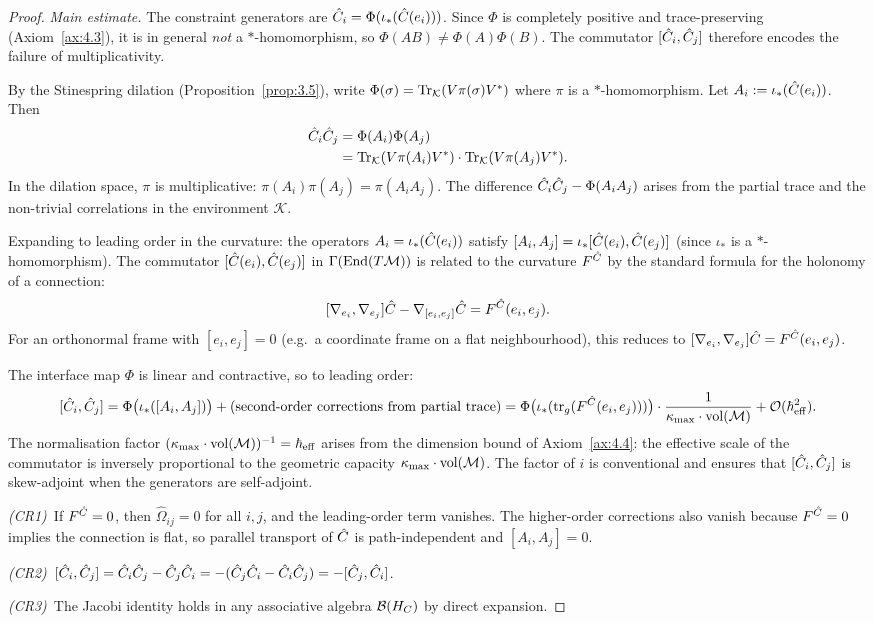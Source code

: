 \begin{proof}
\textit{Main estimate.}
The constraint generators are $\hat{C}_i = \Phi(\iota_*(\hat{C}(e_i)))$.
Since $\Phi$ is completely positive and trace-preserving
(Axiom~\ref{ax:4.3}), it is in general \emph{not} a $*$-homomorphism,
so $\Phi(AB) \neq \Phi(A)\Phi(B)$.  The commutator
$[\hat{C}_i, \hat{C}_j]$ therefore encodes the failure of multiplicativity.

By the Stinespring dilation (Proposition~\ref{prop:3.5}), write
$\Phi(\sigma) = \mathrm{Tr}_\mathcal{K}(V \pi(\sigma) V^*)$ where $\pi$ is
a $*$-homomorphism.  Let $A_i := \iota_*(\hat{C}(e_i))$.  Then
\begin{align*}
  \hat{C}_i \hat{C}_j
  &= \Phi(A_i)\Phi(A_j) \\
  &= \mathrm{Tr}_\mathcal{K}(V\pi(A_i)V^*) \cdot \mathrm{Tr}_\mathcal{K}(V\pi(A_j)V^*).
\end{align*}
In the dilation space, $\pi$ is multiplicative:
$\pi(A_i)\pi(A_j) = \pi(A_i A_j)$.  The difference
$\hat{C}_i \hat{C}_j - \Phi(A_i A_j)$ arises from the partial trace and
the non-trivial correlations in the environment $\mathcal{K}$.

Expanding to leading order in the curvature:  the operators
$A_i = \iota_*(\hat{C}(e_i))$ satisfy
$[A_i, A_j] = \iota_*[\hat{C}(e_i), \hat{C}(e_j)]$ (since $\iota_*$ is a
$*$-homomorphism).  The commutator
$[\hat{C}(e_i), \hat{C}(e_j)]$ in $\Gamma(\mathrm{End}(T\mathcal{M}))$ is related
to the curvature $F^{\hat{C}}$ by the standard formula for the holonomy
of a connection:
\[
  [\nabla_{e_i}, \nabla_{e_j}]\hat{C} - \nabla_{[e_i,e_j]}\hat{C}
  = F^{\hat{C}}(e_i, e_j).
\]
For an orthonormal frame with $[e_i, e_j] = 0$ (e.g.\ a coordinate
frame on a flat neighbourhood), this reduces to
$[\nabla_{e_i}, \nabla_{e_j}]\hat{C} = F^{\hat{C}}(e_i, e_j)$.

The interface map $\Phi$ is linear and contractive, so to leading order:
\[
  [\hat{C}_i, \hat{C}_j]
  = \Phi\bigl(\iota_*([A_i, A_j])\bigr)
    + \text{(second-order corrections from partial trace)}
  = \Phi\bigl(\iota_*(\mathrm{tr}_g(F^{\hat{C}}(e_i, e_j)))\bigr)
    \cdot \frac{1}{\kappa_{\max} \cdot \mathrm{vol}(\mathcal{M})}
    + \mathcal{O}(\hbar_{\mathrm{eff}}^2).
\]
The normalisation factor $(\kappa_{\max} \cdot \mathrm{vol}(\mathcal{M}))^{-1}
= \hbar_{\mathrm{eff}}$ arises from the dimension bound of
Axiom~\ref{ax:4.4}: the effective scale of the commutator is inversely
proportional to the geometric capacity
$\kappa_{\max} \cdot \mathrm{vol}(\mathcal{M})$.  The factor of $i$ is
conventional and ensures that $[\hat{C}_i, \hat{C}_j]$ is skew-adjoint
when the generators are self-adjoint.

\textit{(CR1)}~If $F^{\hat{C}} = 0$, then $\hat\Omega_{ij} = 0$ for
all $i, j$, and the leading-order term vanishes.  The
higher-order corrections also vanish because $F^{\hat{C}} = 0$ implies
the connection is flat, so parallel transport of $\hat{C}$ is
path-independent and $[A_i, A_j] = 0$.

\textit{(CR2)}~$[\hat{C}_i, \hat{C}_j] = \hat{C}_i\hat{C}_j - \hat{C}_j\hat{C}_i
= -(\hat{C}_j\hat{C}_i - \hat{C}_i\hat{C}_j) = -[\hat{C}_j, \hat{C}_i]$.

\textit{(CR3)}~The Jacobi identity holds in any associative algebra
$\mathcal{B}(H_C)$ by direct expansion.
\end{proof}

